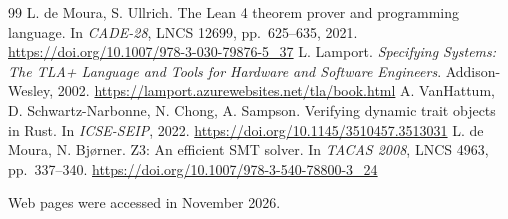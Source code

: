 \documentclass[11pt]{article}
\begin{document}
\begin{thebibliography}{99}
 L. de Moura, S. Ullrich. The Lean 4 theorem prover and programming language. In \emph{CADE-28}, LNCS 12699, pp.~625--635, 2021. \url{https://doi.org/10.1007/978-3-030-79876-5_37}
 L. Lamport. \emph{Specifying Systems: The TLA+ Language and Tools for Hardware and Software Engineers}. Addison-Wesley, 2002. \url{https://lamport.azurewebsites.net/tla/book.html}
 A. VanHattum, D. Schwartz-Narbonne, N. Chong, A. Sampson. Verifying dynamic trait objects in Rust. In \emph{ICSE-SEIP}, 2022. \url{https://doi.org/10.1145/3510457.3513031}
 L. de Moura, N. Bj{\o}rner. Z3: An efficient SMT solver. In \emph{TACAS 2008}, LNCS 4963, pp.~337--340. \url{https://doi.org/10.1007/978-3-540-78800-3_24}

\smallskip\noindent Web pages were accessed in November 2026.
\end{thebibliography}
\end{document}
